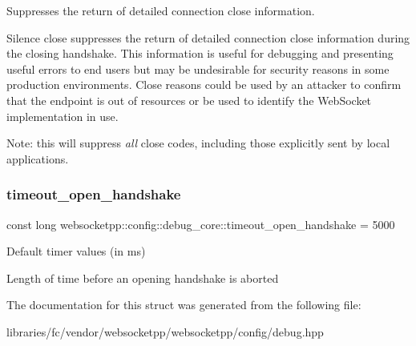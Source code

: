 Suppresses the return of detailed connection close information. 

Silence close suppresses the return of detailed connection close information during the closing handshake. This information is useful for debugging and presenting useful errors to end users but may be undesirable for security reasons in some production environments. Close reasons could be used by an attacker to confirm that the endpoint is out of resources or be used to identify the Web\+Socket implementation in use.

Note\+: this will suppress {\itshape all} close codes, including those explicitly sent by local applications. \mbox{\label{structwebsocketpp_1_1config_1_1debug__core_a99182b8a1b9b1d62075d414705165117}} 
\subsubsection{\texorpdfstring{timeout\+\_\+open\+\_\+handshake}{timeout\_open\_handshake}}
{\footnotesize\ttfamily const long websocketpp\+::config\+::debug\+\_\+core\+::timeout\+\_\+open\+\_\+handshake = 5000\hspace{0.3cm}{\ttfamily [static]}}



Default timer values (in ms) 

Length of time before an opening handshake is aborted 

The documentation for this struct was generated from the following file\+:\begin{DoxyCompactItemize}
\item 
libraries/fc/vendor/websocketpp/websocketpp/config/debug.\+hpp\end{DoxyCompactItemize}
